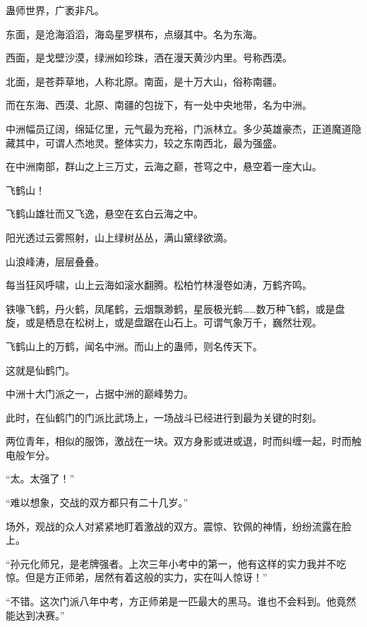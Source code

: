 
\begin{this_body}



蛊师世界，广袤非凡。

东面，是沧海滔滔，海岛星罗棋布，点缀其中。名为东海。

西面，是戈壁沙漠，绿洲如珍珠，洒在漫天黄沙内里。号称西漠。

北面，是苍莽草地，人称北原。南面，是十万大山，俗称南疆。

而在东海、西漠、北原、南疆的包拢下，有一处中央地带，名为中洲。

中洲幅员辽阔，绵延亿里，元气最为充裕，门派林立。多少英雄豪杰，正道魔道隐藏其中，可谓人杰地灵。整体实力，较之东南西北，最为强盛。

在中洲南部，群山之上三万丈，云海之巅，苍穹之中，悬空着一座大山。

飞鹤山！

飞鹤山雄壮而又飞逸，悬空在玄白云海之中。

阳光透过云雾照射，山上绿树丛丛，满山黛绿欲滴。

山浪峰涛，层层叠叠。

每当狂风呼啸，山上云海如滚水翻腾。松柏竹林漫卷如涛，万鹤齐鸣。

铁喙飞鹤，丹火鹤，凤尾鹤，云烟飘渺鹤，星辰极光鹤……数万种飞鹤，或是盘旋，或是栖息在松树上，或是盘踞在山石上。可谓气象万千，巍然壮观。

飞鹤山上的万鹤，闻名中洲。而山上的蛊师，则名传天下。

这就是仙鹤门。

中洲十大门派之一，占据中洲的巅峰势力。

此时，在仙鹤门的门派比武场上，一场战斗已经进行到最为关键的时刻。

两位青年，相似的服饰，激战在一块。双方身影或进或退，时而纠缠一起，时而触电般乍分。

“太。太强了！”

“难以想象，交战的双方都只有二十几岁。”

场外，观战的众人对紧紧地盯着激战的双方。震惊、钦佩的神情，纷纷流露在脸上。

“孙元化师兄，是老牌强者。上次三年小考中的第一，他有这样的实力我并不吃惊。但是方正师弟，居然有着这般的实力，实在叫人惊讶！”

“不错。这次门派八年中考，方正师弟是一匹最大的黑马。谁也不会料到。他竟然能达到决赛。”


\end{this_body}
